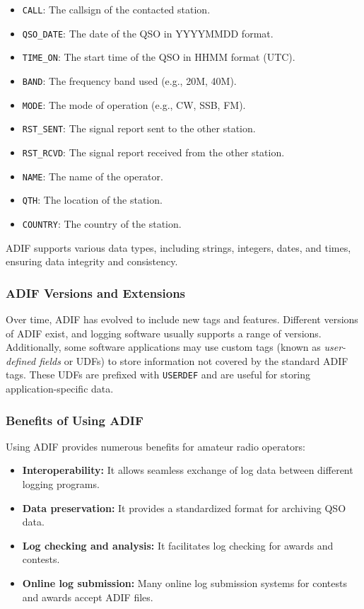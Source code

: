 \begin{itemize}
    \item \texttt{CALL}: The callsign of the contacted station.
    \item \texttt{QSO\_DATE}: The date of the QSO in YYYYMMDD format.
    \item \texttt{TIME\_ON}: The start time of the QSO in HHMM format (UTC).
    \item \texttt{BAND}: The frequency band used (e.g., 20M, 40M).
    \item \texttt{MODE}: The mode of operation (e.g., CW, SSB, FM).
    \item \texttt{RST\_SENT}: The signal report sent to the other station.
    \item \texttt{RST\_RCVD}: The signal report received from the other station.
    \item \texttt{NAME}: The name of the operator.
    \item \texttt{QTH}: The location of the station.
    \item \texttt{COUNTRY}: The country of the station.
\end{itemize}

ADIF supports various data types, including strings, integers, dates, and times, ensuring data integrity and consistency.

\subsubsection{ADIF Versions and Extensions}

Over time, ADIF has evolved to include new tags and features. Different versions of ADIF exist, and logging software usually supports a range of versions. Additionally, some software applications may use custom tags (known as \textit{user-defined fields} or UDFs) to store information not covered by the standard ADIF tags. These UDFs are prefixed with \texttt{USERDEF} and are useful for storing application-specific data.

\subsubsection{Benefits of Using ADIF}

Using ADIF provides numerous benefits for amateur radio operators:

\begin{itemize}
    \item \textbf{Interoperability:} It allows seamless exchange of log data between different logging programs.
    \item \textbf{Data preservation:} It provides a standardized format for archiving QSO data.
    \item \textbf{Log checking and analysis:} It facilitates log checking for awards and contests.
    \item \textbf{Online log submission:} Many online log submission systems for contests and awards accept ADIF files.
\end{itemize}

